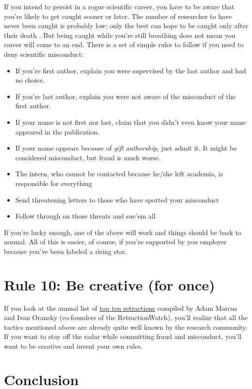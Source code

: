 \documentclass[a4paper,10pt,onecolumn]{article}
\begin{document}
If you intend to persist in a rogue scientific career, you have to be aware that
you're likely to get caught sooner or later. The number of researcher to have never been caught is probably low; only the best can hope to be caught only after their death
\citep{degroote:2016,}. But being caught while you're still breathing does not mean you career will come to
an end. There is a set of simple rules to follow if you need to deny scientific misconduct:
\begin{itemize}
  \item If you're first author, explain you were supervised by the last author and
    had no choice.
  \item If you're last author, explain you were not aware of the misconduct of
    the first author.
  \item If your name is not first nor last, claim that you didn't even know your
    name appeared in the publication.
  \item If your name appears because of {\em gift authorship}, just admit it.
    It might be considered misconduct, but fraud is much worse.
  \item The intern, who cannot be contacted because he/she left academia, is
    responsible for everything
  \item Send threatening letters to those who have spotted your misconduct
  \item Follow through on those threats and sue'em all
\end{itemize}
If you're lucky enough, one of the above will work and things should be back to
normal. All of this is easier, of course, if you're supported by you employer because you've been
labeled a rising star.

\section*{Rule 10: Be creative (for once)}

If you look at the annual list of
\href{http://www.the-scientist.com/?articles.view/articleNo/47813/title/Top-10-Retractions-of-2016/}{top
  ten retractions} compiled by Adam Marcus and Ivan Oransky (co-founders of the
RetractionWatch), you'll realize that all the tactics mentioned above are
already quite well known by the research community. If you want to stay off the radar
while committing fraud and misconduct, you'll want to be creative and invent
your own rules. 

\section*{Conclusion}
\end{document}
